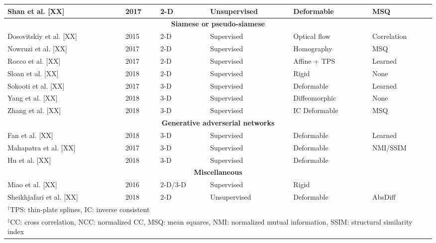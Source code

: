 \begin{table}[!htb]
\begin{tabular*}{\textwidth}{l@{\extracolsep{\fill}}l@{\extracolsep{\fill}}l@{\extracolsep{\fill}}l@{\extracolsep{\fill}}l@{\extracolsep{\fill}}l}
  Shan et al. [XX] & 2017 & 2-D & Unsupervised & Deformable & MSQ \\
\midrule
\multicolumn{6}{c}{\textbf{Siamese or pseudo-siamese}}
  \vspace{0.25cm} \\
  Dosovitskiy et al. [XX] & 2015 & 2-D & Supervised & Optical flow & Correlation \\
  Nowruzi et al. [XX] & 2017 & 2-D & Supervised & Homography & MSQ \\
  Rocco et al. [XX] & 2017 & 2-D & Supervised & Affine + TPS & Learned \\
  Sloan et al. [XX] & 2018 & 2-D & Supervised & Rigid & None \\  %
  Sokooti et al. [XX] & 2017 & 3-D & Supervised & Deformable & Learned \\
  Yang et al. [XX] & 2018 & 3-D & Supervised & Diffeomorphic & None \\  %
  Zhang et al. [XX] & 2018 & 3-D & Supervised & IC Deformable & MSQ \\
\midrule
\multicolumn{6}{c}{\textbf{Generative adverserial networks}}
  \vspace{0.25cm} \\
  Fan et al. [XX] & 2018 & 3-D & Supervised & Deformable & Learned \\
  Mahapatra et al. [XX] & 2017 & 3-D & Supervised & Deformable & NMI/SSIM \\
  Hu et al. [XX] & 2018 & 3-D & Supervised & Deformable & {} \\
\midrule
\multicolumn{6}{c}{\textbf{Miscellaneous}}
  \vspace{0.25cm} \\
  Miao et al. [XX] & 2016 & 2-D/3-D & Supervised & Rigid & {} \\
  Sheikhjafari et al. [XX] & 2018 & 2-D & Unsupervised & Deformable & AbsDiff \\
\bottomrule
\multicolumn{6}{l}{
  \begin{minipage}[t]{0.9\columnwidth}%
    \footnotesize{$^\dagger$TPS: thin-plate splines, IC: inverse consistent}
  \end{minipage}
  } \\
\multicolumn{6}{l}{
  \begin{minipage}[t]{0.9\columnwidth}%
    \footnotesize{$^\ddagger$CC: cross correlation, NCC: normalized CC, MSQ: mean squares,
      NMI:  normalized mutual information, SSIM:  structural similarity index}
  \end{minipage}
  }
\end{tabular*}
\end{table}


